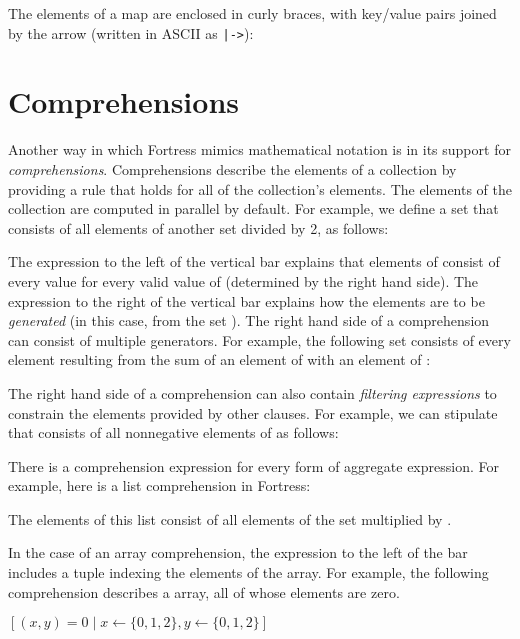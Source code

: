 The elements of a map are enclosed in curly braces, with key/value pairs
joined by the arrow \EXP{\mapsto} (written in ASCII as \verb$|->$):


\section{Comprehensions}
Another way in which Fortress mimics mathematical notation is in its support for
\emph{comprehensions}.  Comprehensions describe the elements of a collection by
providing a rule that holds for all of the collection's elements.  The elements
of the collection are computed in parallel by default.
For example, we define a set  that consists of all elements of another
set  divided by 2, as follows:


The expression to the left of the vertical bar
explains that elements of  consist of every value 
for every valid value of  (determined by the right hand side).
The expression to the right of the vertical bar
explains how the elements  are to be \emph{generated}
(in this case, from the set ).
The right hand side of a comprehension can consist of multiple generators.
For example, the following set consists of every element
resulting from the sum of an element of  with an element of :


The right hand side of a comprehension can also contain
\emph{filtering expressions} to constrain the elements provided by other clauses.
For example, we can stipulate that  consists of
all nonnegative elements of  as follows:


There is a comprehension expression for every form of aggregate expression.
For example, here is a list comprehension in Fortress:

The elements of this list consist of
all elements of the set  multiplied by .

In the case of an array comprehension, the expression to the left of the bar
includes a tuple indexing the elements of the array.
For example, the following comprehension describes a 
array, all of whose elements are zero.
\begin{Fortress}
\([(x,y) = 0 \mid x \leftarrow \{0,1,2\}, y \leftarrow \{0,1,2\}]\)
\end{Fortress}

